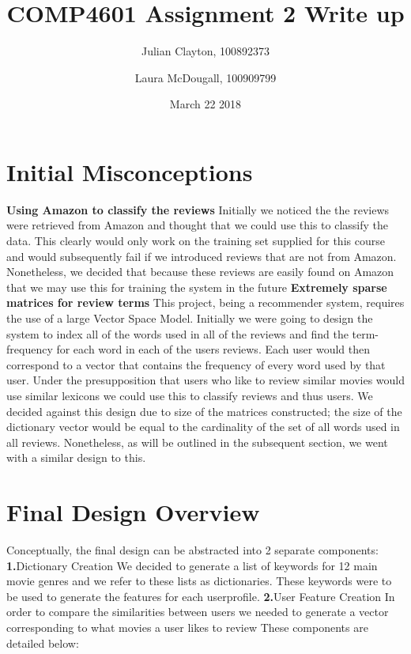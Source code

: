 \documentclass{article}
\title{COMP4601 Assignment 2 Write up}
\author{Julian Clayton, 100892373 \and  Laura McDougall, 100909799}
\date{March 22 2018}
\begin{document}
\maketitle

\section{Initial Misconceptions}
\textbf{Using Amazon to classify the reviews}\newline
Initially we noticed the the reviews were retrieved from Amazon and thought that we could use this to classify the data. This clearly would only work on the training set supplied for this course and would subsequently fail if we introduced reviews that are not from Amazon. Nonetheless, we decided that because these reviews are easily found on Amazon that  we may use this for training the system in the future \newline\newline
\textbf{Extremely sparse matrices for review terms}\newline
This project, being a recommender system, requires the use of a large Vector Space Model. Initially we were going to design the system to index all of the words used in all of the reviews and find the term-frequency for each word in each of the users reviews.  Each user would then correspond to a vector that contains the frequency of every word used by that user. Under the presupposition that users who like to review similar movies would use similar lexicons we could use this to classify reviews and thus users. We decided against this design due to size of the matrices constructed; the size of the dictionary vector would be equal to the cardinality of the set of all words used in all reviews. Nonetheless, as will be outlined in the subsequent section, we went with a similar design to this. 
\section{Final Design Overview}
Conceptually, the final  design can be abstracted into 2 separate components: \newline\newline
\textbf{1.}\space Dictionary Creation\newline
We decided to generate a list of keywords for 12 main movie genres and we refer to these lists as dictionaries. These keywords were to be used to generate the features for each userprofile.\newline 
\textbf{2.}\space User Feature Creation\newline
In order to compare the similarities between users we needed to generate a vector corresponding to what movies a user likes to review \newline\newline
These components are detailed below:
\end{document}
